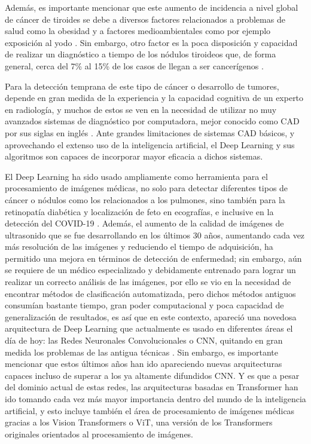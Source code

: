 Además, es importante mencionar que este aumento de incidencia a nivel global de cáncer de tiroides se debe a diversos factores relacionados a problemas de salud como la obesidad y a factores medioambientales como por ejemplo exposición al yodo \parencite{pr_kim2020geoinflu}. Sin embargo, otro factor es la poca disposición y capacidad de realizar un diagnóstico a tiempo de los nódulos tiroideos que, de forma general, cerca del 7\% al 15\% de los casos de llegan a ser cancerígenos \parencite{pr_haugen2016amethy}.

Para la detección temprana de este tipo de cáncer o desarrollo de tumores, depende en gran medida de la experiencia y la capacidad cognitiva de un experto en radiología, y muchos de estos se ven en la necesidad de utilizar no muy avanzados sistemas de diagnóstico por computadora, mejor conocido como CAD por sus siglas en inglés \parencite{pr_zhu2021agendlframew}. Ante grandes limitaciones de sistemas CAD básicos, y aprovechando el extenso uso de la inteligencia artificial, el Deep Learning y sus algoritmos son capaces de incorporar mayor eficacia a dichos sistemas.

El Deep Learning ha sido usado ampliamente como herramienta para el procesamiento de imágenes médicas, no solo para detectar diferentes tipos de cáncer o nódulos como los relacionados a los pulmones, sino también para la retinopatía diabética y localización de feto en ecografías, e inclusive en la detección del COVID-19 \parencite{pr_bhatta2021medimage}. Además, el aumento de la calidad de imágenes de ultrasonido que se fue desarrollando en los últimos 30 años, aumentando cada vez más resolución de las imágenes y reduciendo el tiempo de adquisición, ha permitido una mejora en términos de detección de enfermedad; sin embargo, aún se requiere de un médico especializado y debidamente entrenado para lograr un realizar un correcto análisis de las imágenes, por ello se vio en la necesidad de encontrar métodos de clasificación automatizada, pero dichos métodos antiguos consumían bastante tiempo, gran poder computacional y poca capacidad de generalización de resultados, es así que en este contexto, apareció una novedosa arquitectura de Deep Learning que actualmente es usado en diferentes áreas el día de hoy: las Redes Neuronales Convolucionales o CNN, quitando en gran medida los problemas de las antigua técnicas \parencite{pr_signgh20203ddl}. Sin embargo, es importante mencionar que estos últimos años han ido apareciendo nuevas arquitecturas capaces incluso de superar a los ya altamente difundidos CNN. Y es que a pesar del dominio actual de estas redes, las arquitecturas basadas en Transformer han ido tomando cada vez más mayor importancia dentro del mundo de la inteligencia artificial, y esto incluye también el área de procesamiento de imágenes médicas gracias a los Vision Transformers o ViT, una versión de los Transformers originales orientados al procesamiento de imágenes.
 
